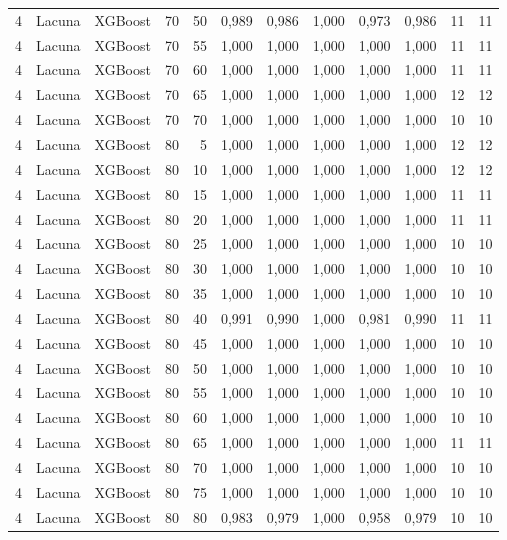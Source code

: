 \begin{longtable}{@{}rllrrrrrrrrr@{}}
4 & Lacuna & XGBoost & 70 & 50 & 0,989 & 0,986 & 1,000 & 0,973 & 0,986 & 11 & 11 \\
4 & Lacuna & XGBoost & 70 & 55 & 1,000 & 1,000 & 1,000 & 1,000 & 1,000 & 11 & 11 \\
4 & Lacuna & XGBoost & 70 & 60 & 1,000 & 1,000 & 1,000 & 1,000 & 1,000 & 11 & 11 \\
4 & Lacuna & XGBoost & 70 & 65 & 1,000 & 1,000 & 1,000 & 1,000 & 1,000 & 12 & 12 \\
4 & Lacuna & XGBoost & 70 & 70 & 1,000 & 1,000 & 1,000 & 1,000 & 1,000 & 10 & 10 \\
4 & Lacuna & XGBoost & 80 & 5 & 1,000 & 1,000 & 1,000 & 1,000 & 1,000 & 12 & 12 \\
4 & Lacuna & XGBoost & 80 & 10 & 1,000 & 1,000 & 1,000 & 1,000 & 1,000 & 12 & 12 \\
4 & Lacuna & XGBoost & 80 & 15 & 1,000 & 1,000 & 1,000 & 1,000 & 1,000 & 11 & 11 \\
4 & Lacuna & XGBoost & 80 & 20 & 1,000 & 1,000 & 1,000 & 1,000 & 1,000 & 11 & 11 \\
4 & Lacuna & XGBoost & 80 & 25 & 1,000 & 1,000 & 1,000 & 1,000 & 1,000 & 10 & 10 \\
4 & Lacuna & XGBoost & 80 & 30 & 1,000 & 1,000 & 1,000 & 1,000 & 1,000 & 10 & 10 \\
4 & Lacuna & XGBoost & 80 & 35 & 1,000 & 1,000 & 1,000 & 1,000 & 1,000 & 10 & 10 \\
4 & Lacuna & XGBoost & 80 & 40 & 0,991 & 0,990 & 1,000 & 0,981 & 0,990 & 11 & 11 \\
4 & Lacuna & XGBoost & 80 & 45 & 1,000 & 1,000 & 1,000 & 1,000 & 1,000 & 10 & 10 \\
4 & Lacuna & XGBoost & 80 & 50 & 1,000 & 1,000 & 1,000 & 1,000 & 1,000 & 10 & 10 \\
4 & Lacuna & XGBoost & 80 & 55 & 1,000 & 1,000 & 1,000 & 1,000 & 1,000 & 10 & 10 \\
4 & Lacuna & XGBoost & 80 & 60 & 1,000 & 1,000 & 1,000 & 1,000 & 1,000 & 10 & 10 \\
4 & Lacuna & XGBoost & 80 & 65 & 1,000 & 1,000 & 1,000 & 1,000 & 1,000 & 11 & 11 \\
4 & Lacuna & XGBoost & 80 & 70 & 1,000 & 1,000 & 1,000 & 1,000 & 1,000 & 10 & 10 \\
4 & Lacuna & XGBoost & 80 & 75 & 1,000 & 1,000 & 1,000 & 1,000 & 1,000 & 10 & 10 \\
4 & Lacuna & XGBoost & 80 & 80 & 0,983 & 0,979 & 1,000 & 0,958 & 0,979 & 10 & 10 \\

\end{longtable}
